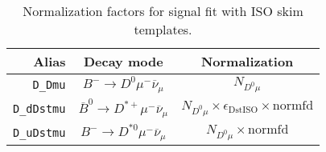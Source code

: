 


\begin{landscape}
\begin{table}
\centering
\caption{
    Normalization factors for \Dz signal fit with ISO skim templates.
}
\label{tab:fit-norm-fact-d0}
\scriptsize

\begin{tabular}{r|c|c}
\toprule
           \textbf{Alias} &                                 \textbf{Decay mode}                                  &                                                                                                                                                                            \textbf{Normalization}                                                                                                                                                                             \\
\midrule
          \texttt{D\_Dmu} &                    $B^- \rightarrow D^0 \mu^- \overline{\nu}_\mu$                    &                                                                                                                                                                                 $N_{D^0 \mu}$                                                                                                                                                                                 \\
       \texttt{D\_dDstmu} &             $\overline{B}^0 \rightarrow D^{*+} \mu^- \overline{\nu}_\mu$             &                                                                                                                                                       $N_{D^0 \mu} \times \epsilon_\text{DstISO} \times \text{normfd}$                                                                                                                                                        \\
       \texttt{D\_uDstmu} &                  $B^- \rightarrow D^{*0} \mu^- \overline{\nu}_\mu$                   &                                                                                                                                                                      $N_{D^0 \mu} \times \text{normfd}$                                                                                                                                                                       \\

\end{tabular}
\end{table}
\end{landscape}
